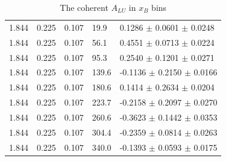 \begin{table}[!h]
\begin{center}
\begin{tabular}{||l|l|l|l|l||}
   \hline                                                                     
  1.844 & 0.225 & 0.107 & 19.9   &  0.1286   $\pm$ 0.0601    $\pm$   0.0248 \\
  1.844 & 0.225 & 0.107 & 56.1   &  0.4551   $\pm$ 0.0713    $\pm$   0.0224 \\
  1.844 & 0.225 & 0.107 & 95.3   &  0.2540   $\pm$ 0.1201    $\pm$   0.0271 \\
  1.844 & 0.225 & 0.107 & 139.6  & -0.1136   $\pm$ 0.2150    $\pm$   0.0166 \\
  1.844 & 0.225 & 0.107 & 180.6  &  0.1414   $\pm$ 0.2634    $\pm$   0.0204 \\
  1.844 & 0.225 & 0.107 & 223.7  & -0.2158   $\pm$ 0.2097    $\pm$   0.0270 \\
  1.844 & 0.225 & 0.107 & 260.6  & -0.3623   $\pm$ 0.1442    $\pm$   0.0353 \\
  1.844 & 0.225 & 0.107 & 304.4  & -0.2359   $\pm$ 0.0814    $\pm$   0.0263 \\
  1.844 & 0.225 & 0.107 & 340.0  & -0.1393   $\pm$ 0.0593    $\pm$   0.0175 \\
         
         \hline 
         \hline
      \end{tabular}
      \caption{The coherent $A_{LU}$ in $x_B$ bins}
      \label{table:Coh_xB_BSA}
   \end{center}
\end{table}                        

